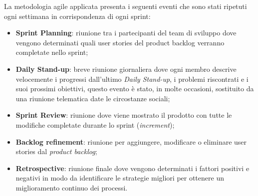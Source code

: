\noindent
La metodologia agile applicata presenta i seguenti eventi che sono stati ripetuti ogni settimana in corrispondenza di ogni sprint:
\begin{itemize}
	\item \textbf{Sprint Planning}: riunione tra i partecipanti del team di sviluppo dove vengono determinati quali user stories del product backlog verranno completate nello sprint;
	
	\item \textbf{Daily Stand-up}: breve riunione giornaliera dove ogni membro descrive velocemente i progressi dall'ultimo  \emph{Daily Stand-up}, i problemi riscontrati e i suoi prossimi obiettivi, questo evento è stato, in molte occasioni, sostituito da una riunione telematica date le circostanze sociali;
	
	\item \textbf{Sprint Review}: riunione dove viene mostrato il prodotto con tutte le modifiche completate durante lo sprint (\emph{increment});
	
	\item \textbf{Backlog refinement}: riunione per aggiungere, modificare o eliminare user stories dal \emph{product backlog};
	
	\item \textbf{Retrospective}: riunione finale dove vengono determinati i fattori positivi e negativi in modo da identificare le strategie migliori per ottenere un miglioramento continuo dei processi.
\end{itemize}
\noindent

